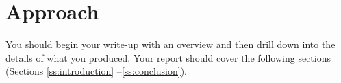 \section{Approach}
You should begin your write-up with an overview and then drill down
into the details of what you produced. Your report should cover the
following sections (Sections \ref{ss:introduction} --\ref{ss:conclusion}).
